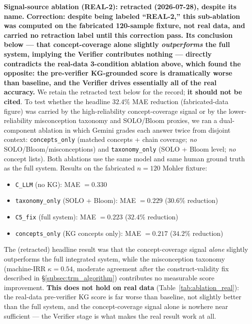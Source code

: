 \documentclass[conference]{IEEEtran}
\begin{document}
\textbf{Signal-source ablation (REAL-2): retracted (2026-07-28), despite
its name.} \textbf{Correction: despite being labeled ``REAL-2,'' this
sub-ablation was computed on the fabricated 120-sample fixture, not real
data, and carried no retraction label until this correction pass. Its
conclusion below --- that concept-coverage alone slightly
\emph{outperforms} the full system, implying the Verifier contributes
nothing --- directly contradicts the real-data 3-condition ablation
above, which found the opposite: the pre-verifier KG-grounded score is
dramatically worse than baseline, and the Verifier drives essentially
all of the real accuracy.} We retain the retracted text below for the
record; \textbf{it should not be cited}. To test whether the headline
$32.4\%$ MAE reduction (fabricated-data figure) was carried by the
high-reliability concept-coverage signal or by the lower-reliability
misconception taxonomy and SOLO/Bloom proxies, we ran a dual-component
ablation in which Gemini grades each
answer twice from disjoint context: \texttt{concepts\_only} (matched
concepts + chain coverage; \emph{no} SOLO/Bloom/misconceptions) and
\texttt{taxonomy\_only} (SOLO + Bloom level; \emph{no} concept lists).
Both ablations use the same model and same human ground truth as the full
system. Results on the fabricated $n = 120$ Mohler fixture:

\begin{itemize}
\item \texttt{C\_LLM} (no KG):                 MAE $= 0.330$
\item \texttt{taxonomy\_only} (SOLO + Bloom):  MAE $= 0.229$  ($30.6\%$ reduction)
\item \texttt{C5\_fix} (full system):          MAE $= 0.223$  ($32.4\%$ reduction)
\item \texttt{concepts\_only} (KG concepts only): MAE $= 0.217$  ($\boldsymbol{34.2\%}$ reduction)
\end{itemize}

The (retracted) headline result was that the concept-coverage signal \emph{alone}
slightly outperforms the full integrated system, while the misconception
taxonomy (machine-IRR $\kappa = 0.54$, moderate agreement after the
construct-validity fix described in \S\ref{subsec:trm_algorithm})
contributes no measurable score improvement. \textbf{This does not hold on
real data} (Table~\ref{tab:ablation_real}): the real-data pre-verifier
KG score is far worse than baseline, not slightly better than the full
system, and the concept-coverage signal alone is nowhere near sufficient
--- the Verifier stage is what makes the real result work at all.
\end{document}

